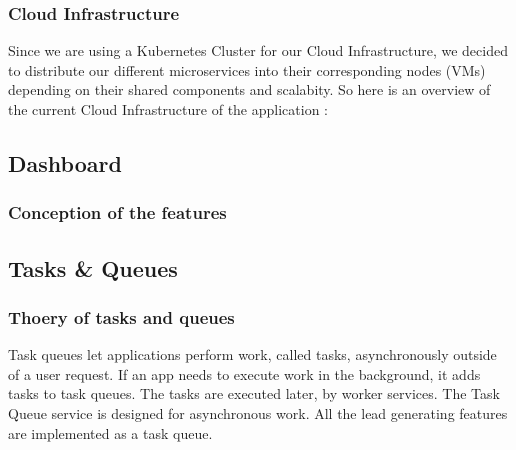\subsubsection{Cloud Infrastructure}
Since we are using a Kubernetes Cluster for our Cloud Infrastructure, we decided to distribute our different microservices into their corresponding nodes (VMs) depending on their shared components and scalabity. So here is an overview of the current Cloud Infrastructure of the application :
\linebreak
{}
\subsection{Dashboard}
\subsubsection{Conception of the features}
\newpage
\subsection{Tasks \& Queues}
\subsubsection{Thoery of tasks and queues}
Task queues let applications perform work, called tasks, asynchronously outside of a user request. If an app needs to execute work in the background,
 it adds tasks to task queues. The tasks are executed later, by worker services. The Task Queue service is designed for asynchronous work.
\linebreak
All the lead generating features are implemented as a task queue.
\linebreak
\linebreak
{}
\newpage
